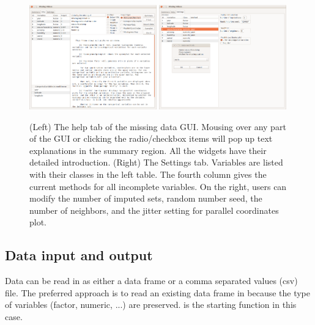 \documentclass[article]{jss}
\begin{document}
\begin{figure}[h]
\begin{centering}
\includegraphics[width=0.49\textwidth]{graph/fig1-GUI-tab2} 
\includegraphics[width=0.49\textwidth]{graph/fig1-GUI-tab3}
\par\end{centering}
\caption{(Left) The help tab of the missing data GUI. Mousing over any part of the GUI or clicking the radio/checkbox items will pop up text explanations in the summary region. All the widgets have their detailed introduction. (Right) The Settings tab. Variables are listed with their classes in the left table. The fourth column gives the current  methods for all incomplete variables. On the right, users can modify the number of imputed sets, random number seed, the number of neighbors, and the jitter setting for parallel coordinates plot.}
\label{fig: missingGUI-tabs}
\end{figure}


\subsection{Data input and output}

Data can be read in as either a data frame or a comma separated values (csv) file. The preferred approach is to read an existing data frame in  because the type of variables (factor, numeric, ...) are preserved.  is the starting function in this case.
\end{document}
